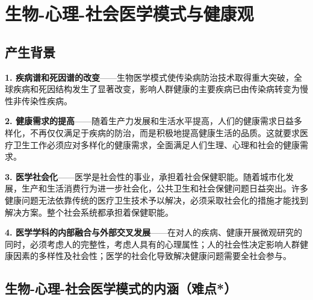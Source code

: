 \section{生物-心理-社会医学模式与健康观}

\subsection{产生背景}

\begin{keybox}
\textbf{1. 疾病谱和死因谱的改变}——生物医学模式使传染病防治技术取得重大突破，全球疾病和死因结构发生了显著改变，影响人群健康的主要疾病已由传染病转变为慢性非传染性疾病。

\textbf{2. 健康需求的提高}——随着生产力发展和生活水平提高，人们的健康需求日益多样化，不再仅仅满足于疾病的防治，而是积极地提高健康生活的品质。这就要求医疗卫生工作必须应对多样化的健康需求，全面满足人们生理、心理和社会的健康需求。

\textbf{3. 医学社会化}——医学是社会性的事业，承担着社会保健职能。随着城市化发展，生产和生活消费行为进一步社会化，公共卫生和社会保健问题日益突出。许多健康问题无法依靠传统的医疗卫生技术予以解决，必须采取社会化的措施才能找到解决方案。整个社会系统都承担着保健职能。

\textbf{4. 医学学科的内部融合与外部交叉发展}——在对人的疾病、健康开展微观研究的同时，必须考虑人的完整性，考虑人具有的心理属性；人的社会性决定影响人群健康因素的多样性及社会性；医学的社会化导致解决健康问题需要全社会参与。
\end{keybox}

\subsection{生物-心理-社会医学模式的内涵（难点*）}

